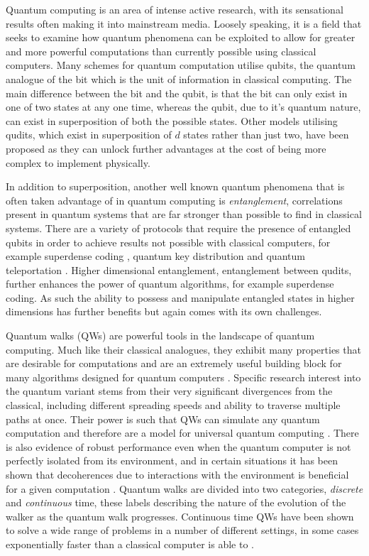Quantum computing is an area of intense active research, with its sensational results often making it into mainstream media.
Loosely speaking, it is a field that seeks to examine how quantum phenomena can be exploited to allow for greater and more powerful computations than currently possible using classical computers.
Many schemes for quantum computation utilise qubits, the quantum analogue of the bit which is the unit of information in classical computing.
The main difference between the bit and the qubit, is that the bit can only exist in one of two states at any one time, whereas the qubit, due to it's quantum nature, can exist in superposition of both the possible states.
Other models utilising qudits, which exist in superposition of $d$ states rather than just two, have been proposed as they can unlock further advantages at the cost of being more complex to implement physically.

In addition to superposition, another well known quantum phenomena that is often taken advantage of in quantum computing is \emph{entanglement}, correlations present in quantum systems that are far stronger than possible to find in classical systems.
There are a variety of protocols that require the presence of entangled qubits in order to achieve results not possible with classical computers, for example superdense coding \cite{Superdense}, quantum key distribution \cite{qkd} and quantum teleportation \cite{qteleport}.
Higher dimensional entanglement, entanglement between qudits, further enhances the power of quantum algorithms, for example superdense coding.
As such the ability to possess and manipulate entangled states in higher dimensions has further benefits but again comes with its own challenges. 

Quantum walks (QWs) are powerful tools in the landscape of quantum computing. 
Much like their classical analogues, they exhibit many properties that are desirable for computations and are an extremely useful building block for many algorithms designed for quantum computers \cite{shenvi2003}. 
Specific research interest into the quantum variant stems from their very significant divergences from the classical, including different spreading speeds and ability to traverse multiple paths at once. 
Their power is such that QWs can simulate any quantum computation and therefore are a model for universal quantum computing \cite{Childs_2009}.
There is also evidence of robust performance even when the quantum computer is not perfectly isolated from its environment, and in certain situations it has been shown that decoherences due to interactions with the environment is beneficial for a given computation \cite{KENDON_2007}. 
Quantum walks are divided into two categories, \emph{discrete} and \emph{continuous} time, these labels describing the nature of the evolution of the walker as the quantum walk progresses.
Continuous time QWs have been shown to solve a wide range of problems in a number of different settings, in some cases exponentially faster than a classical computer is able to \cite{Childs_2003}. 

